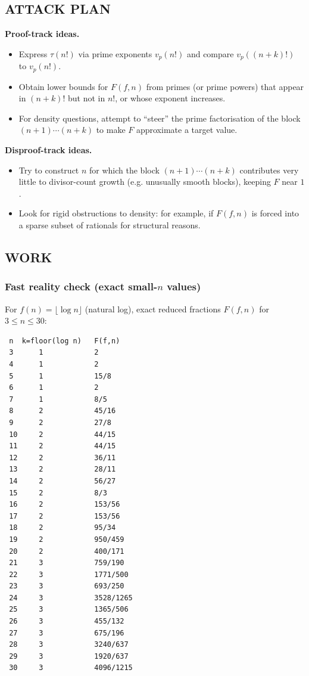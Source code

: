 \subsection*{ATTACK PLAN}
\textbf{Proof-track ideas.}
\begin{itemize}
\item Express $\tau(n!)$ via prime exponents $v_p(n!)$ and compare $v_p((n+k)!)$ to $v_p(n!)$.
\item Obtain lower bounds for $F(f,n)$ from primes (or prime powers) that appear in $(n+k)!$ but not in $n!$, or whose exponent increases.
\item For density questions, attempt to ``steer'' the prime factorisation of the block $(n+1)\cdots(n+k)$ to make $F$ approximate a target value.
\end{itemize}
\textbf{Disproof-track ideas.}
\begin{itemize}
\item Try to construct $n$ for which the block $(n+1)\cdots(n+k)$ contributes very little to divisor-count growth (e.g. unusually smooth blocks), keeping $F$ near $1$.
\item Look for rigid obstructions to density: for example, if $F(f,n)$ is forced into a sparse subset of rationals for structural reasons.
\end{itemize}

\subsection*{WORK}
\subsubsection*{Fast reality check (exact small-$n$ values)}
For $f(n)=\lfloor\log n\rfloor$ (natural log), exact reduced fractions $F(f,n)$ for $3\le n\le 30$:
\begin{verbatim}
 n  k=floor(log n)   F(f,n)
 3      1            2
 4      1            2
 5      1            15/8
 6      1            2
 7      1            8/5
 8      2            45/16
 9      2            27/8
 10     2            44/15
 11     2            44/15
 12     2            36/11
 13     2            28/11
 14     2            56/27
 15     2            8/3
 16     2            153/56
 17     2            153/56
 18     2            95/34
 19     2            950/459
 20     2            400/171
 21     3            759/190
 22     3            1771/500
 23     3            693/250
 24     3            3528/1265
 25     3            1365/506
 26     3            455/132
 27     3            675/196
 28     3            3240/637
 29     3            1920/637
 30     3            4096/1215
\end{verbatim}

